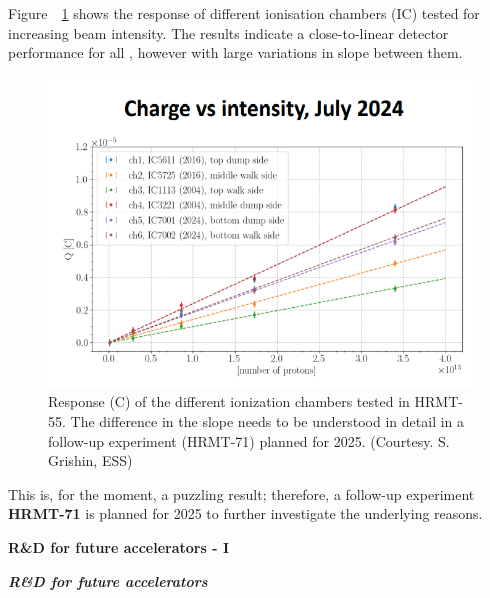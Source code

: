 Figure~~\ref{fig:hiradmat_IC_response} shows the response of different ionisation chambers (IC) tested for increasing beam intensity. The results indicate a close-to-linear detector performance for all , however with large variations in slope between them. 
\begin{figure}[!h]
    \centering
    \includegraphics[width=0.8\linewidth]{graphics/hiradmat_IC_response.png}
    \caption{Response (C) of the different ionization chambers tested in HRMT-55. The difference in the slope needs to be understood in detail in a follow-up experiment (HRMT-71) planned for 2025. (Courtesy. S. Grishin, ESS)}
    \label{fig:hiradmat_IC_response}
\end{figure}
This is, for the moment, a puzzling result; therefore, a follow-up experiment \textbf{HRMT-71} is planned for 2025 to further investigate the underlying reasons.

\textbf{R\&D for future accelerators - I}

\textbf{\textit{R\&D for future accelerators}} \mbox{}

